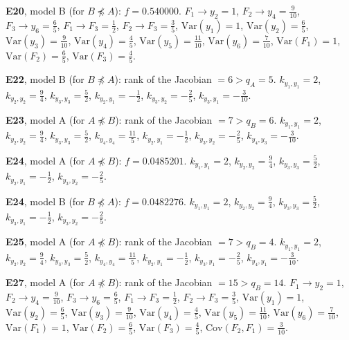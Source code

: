 \documentclass[10pt,a4paper]{article}
\newcommand{\nnest}{\not\preceq}
\begin{document}
{\noindent\textbf{E20}, model B (for $B\nnest A$): $f=0.540000$. {\footnotesize $F_{1}\to y_{2}=1$, $F_{2}\to y_{4}=\tfrac{9}{10}$, $F_{3}\to y_{6}=\tfrac{6}{5}$, $F_{1}\to F_{3}=\tfrac{1}{2}$, $F_{2}\to F_{3}=\tfrac{3}{5}$, $\mathrm{Var}(y_{1})=1$, $\mathrm{Var}(y_{2})=\tfrac{6}{5}$, $\mathrm{Var}(y_{3})=\tfrac{9}{10}$, $\mathrm{Var}(y_{4})=\tfrac{4}{5}$, $\mathrm{Var}(y_{5})=\tfrac{11}{10}$, $\mathrm{Var}(y_{6})=\tfrac{7}{10}$, $\mathrm{Var}(F_{1})=1$, $\mathrm{Var}(F_{2})=\tfrac{6}{5}$, $\mathrm{Var}(F_{3})=\tfrac{4}{5}$.}\par\smallskip
\noindent\textbf{E22}, model B (for $B\nnest A$): rank of the Jacobian $=6>q_A=5$. {\footnotesize $k_{y_{1},y_{1}}=2$, $k_{y_{2},y_{2}}=\tfrac{9}{4}$, $k_{y_{3},y_{3}}=\tfrac{5}{2}$, $k_{y_{2},y_{1}}=-\tfrac{1}{2}$, $k_{y_{3},y_{2}}=-\tfrac{2}{5}$, $k_{y_{3},y_{1}}=-\tfrac{3}{10}$.}\par\smallskip
\noindent\textbf{E23}, model A (for $A\nnest B$): rank of the Jacobian $=7>q_B=6$. {\footnotesize $k_{y_{1},y_{1}}=2$, $k_{y_{2},y_{2}}=\tfrac{9}{4}$, $k_{y_{3},y_{3}}=\tfrac{5}{2}$, $k_{y_{4},y_{4}}=\tfrac{11}{5}$, $k_{y_{2},y_{1}}=-\tfrac{1}{2}$, $k_{y_{3},y_{2}}=-\tfrac{2}{5}$, $k_{y_{4},y_{3}}=-\tfrac{3}{10}$.}\par\smallskip
\noindent\textbf{E24}, model A (for $A\nnest B$): $f=0.0485201$. {\footnotesize $k_{y_{1},y_{1}}=2$, $k_{y_{2},y_{2}}=\tfrac{9}{4}$, $k_{y_{3},y_{3}}=\tfrac{5}{2}$, $k_{y_{2},y_{1}}=-\tfrac{1}{2}$, $k_{y_{3},y_{2}}=-\tfrac{2}{5}$.}\par\smallskip
\noindent\textbf{E24}, model B (for $B\nnest A$): $f=0.0482276$. {\footnotesize $k_{y_{1},y_{1}}=2$, $k_{y_{2},y_{2}}=\tfrac{9}{4}$, $k_{y_{3},y_{3}}=\tfrac{5}{2}$, $k_{y_{3},y_{1}}=-\tfrac{1}{2}$, $k_{y_{3},y_{2}}=-\tfrac{2}{5}$.}\par\smallskip
\noindent\textbf{E25}, model A (for $A\nnest B$): rank of the Jacobian $=7>q_B=4$. {\footnotesize $k_{y_{1},y_{1}}=2$, $k_{y_{2},y_{2}}=\tfrac{9}{4}$, $k_{y_{3},y_{3}}=\tfrac{5}{2}$, $k_{y_{4},y_{4}}=\tfrac{11}{5}$, $k_{y_{2},y_{1}}=-\tfrac{1}{2}$, $k_{y_{3},y_{1}}=-\tfrac{2}{5}$, $k_{y_{4},y_{1}}=-\tfrac{3}{10}$.}\par\smallskip
\noindent\textbf{E27}, model A (for $A\nnest B$): rank of the Jacobian $=15>q_B=14$. {\footnotesize $F_{1}\to y_{2}=1$, $F_{2}\to y_{4}=\tfrac{9}{10}$, $F_{3}\to y_{6}=\tfrac{6}{5}$, $F_{1}\to F_{3}=\tfrac{1}{2}$, $F_{2}\to F_{3}=\tfrac{3}{5}$, $\mathrm{Var}(y_{1})=1$, $\mathrm{Var}(y_{2})=\tfrac{6}{5}$, $\mathrm{Var}(y_{3})=\tfrac{9}{10}$, $\mathrm{Var}(y_{4})=\tfrac{4}{5}$, $\mathrm{Var}(y_{5})=\tfrac{11}{10}$, $\mathrm{Var}(y_{6})=\tfrac{7}{10}$, $\mathrm{Var}(F_{1})=1$, $\mathrm{Var}(F_{2})=\tfrac{6}{5}$, $\mathrm{Var}(F_{3})=\tfrac{4}{5}$, $\mathrm{Cov}(F_{2},F_{1})=\tfrac{3}{10}$.}\par\smallskip
}
\end{document}
